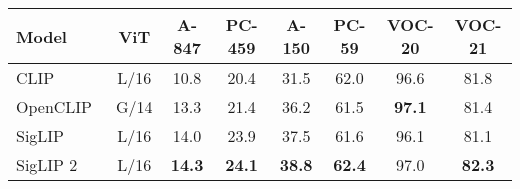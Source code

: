 \begin{tabular}{lccccccc}
\toprule
Model & ViT & A-847 & PC-459 & A-150 & PC-59 & VOC-20 & VOC-21 \\
\midrule
CLIP~\cite{clip} & L/16 & 10.8 & 20.4 & 31.5 & 62.0 & 96.6 & 81.8 \\
OpenCLIP~\cite{ilharco2021open} & G/14 & 13.3 & 21.4 & 36.2 & 61.5 & \textbf{97.1} & 81.4 \\
SigLIP~\cite{siglip} & L/16 & 14.0 &	23.9 &	37.5 &	61.6 &	96.1 &	81.1 \\
SigLIP 2 & L/16 & \textbf{14.3} & \textbf{24.1} &	\textbf{38.8} & \textbf{62.4} &	97.0 & \textbf{82.3} \\
\bottomrule
\end{tabular}